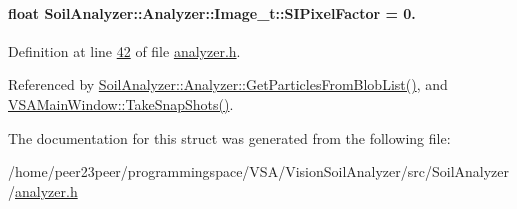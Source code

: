 \hypertarget{struct_soil_analyzer_1_1_analyzer_1_1_image__t_a7b7c4dfb4d2ed5da141feed7cfc9cfe9}{}
\paragraph[{S\+I\+Pixel\+Factor}]{\setlength{\rightskip}{0pt plus 5cm}float Soil\+Analyzer\+::\+Analyzer\+::\+Image\+\_\+t\+::\+S\+I\+Pixel\+Factor = 0.}\label{struct_soil_analyzer_1_1_analyzer_1_1_image__t_a7b7c4dfb4d2ed5da141feed7cfc9cfe9}


Definition at line \hyperlink{analyzer_8h_source_l00042}{42} of file \hyperlink{analyzer_8h_source}{analyzer.\+h}.



Referenced by \hyperlink{analyzer_8cpp_source_l00322}{Soil\+Analyzer\+::\+Analyzer\+::\+Get\+Particles\+From\+Blob\+List()}, and \hyperlink{vsamainwindow_8cpp_source_l00391}{V\+S\+A\+Main\+Window\+::\+Take\+Snap\+Shots()}.



The documentation for this struct was generated from the following file\+:\begin{DoxyCompactItemize}
\item 
/home/peer23peer/programmingspace/\+V\+S\+A/\+Vision\+Soil\+Analyzer/src/\+Soil\+Analyzer/\hyperlink{analyzer_8h}{analyzer.\+h}\end{DoxyCompactItemize}
